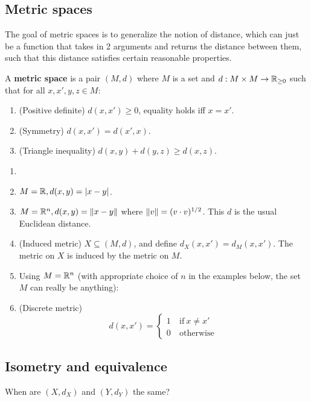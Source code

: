 \subsection{Metric spaces}
The goal of metric spaces is to generalize the notion of distance, which can just be a function that takes in 2 arguments and returns the distance between them, such that this distance satisfies certain reasonable properties.
\begin{definition} 
A \textbf{metric space} is a pair $(M, d)$ where $M$ is a set and $d: M \times M \to \mathbb{R}_{\geq 0}$ such that for all $x, x', y, z \in M$:
\begin{enumerate}
\item (Positive definite) $d(x, x') \geq 0$, equality holds iff $x = x'$.
\item (Symmetry) $d(x, x') = d(x', x)$.
\item (Triangle inequality) $d(x, y) + d(y, z) \geq d(x, z)$.
\end{enumerate}
\end{definition}
\begin{example}
\begin{enumerate}
\item []
\item $M = \mathbb{R}, d(x, y) = \lvert x-y\rvert$.
\item $M = \mathbb{R}^n, d(x, y) = \lVert x-y\rVert$ where $\lVert v\rVert = (v \cdot v)^{1/2}$. This $d$ is the usual Euclidean distance.
\item (Induced metric) $X \subseteq (M, d)$, and define $d_X(x, x') = d_M(x, x')$. The metric on $X$ is induced by the metric on $M$.
\item Using $M = \mathbb{R}^n$ (with appropriate choice of $n$ in the examples below, the set $M$ can really be anything):
\item (Discrete metric) \[
d(x, x') = \begin{cases}
1 & \:\text{if}\: x \neq x' \\
0 & \:\text{otherwise}\: 
\end{cases}
\]
\end{enumerate}
\end{example}

\subsection{Isometry and equivalence}
When are $(X, d_X)$ and $(Y, d_Y)$ the same?

